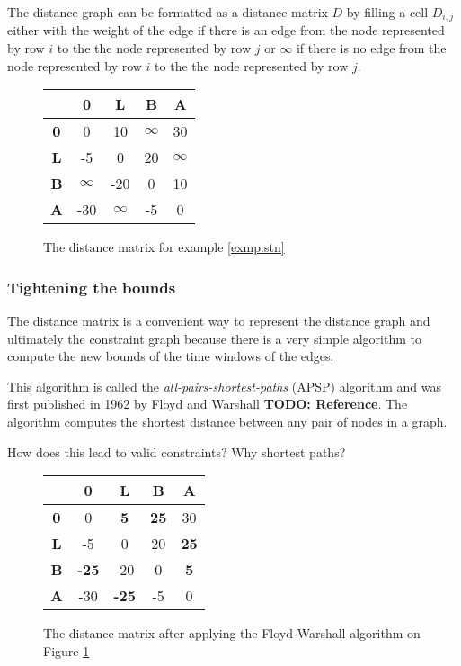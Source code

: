 \documentclass{article}
\theoremstyle{definition}
\newcommand{\TODO}[1]{{\color{red}\textbf{TODO: #1}}}
\begin{document}
The distance graph can be formatted as a distance matrix $D$ by filling a cell $D_{i,j}$ either with the weight of the edge if there is an edge from the node represented by row $i$ to the the node represented by row $j$ or $\infty$ if there is no edge from the node represented by row $i$ to the the node represented by row $j$.

\begin{figure}[h]
	\centering
	\begin{tabular}{ c | c c c c }
	  			& \textbf{0}	& \textbf{L} 	& \textbf{B} 	& \textbf{A} \\ \hline
	  \textbf{0} 	& 0 			& 10		& $\infty$ 	& 30 \\
	  \textbf{L} 	& -5 		& 0			& 20		& $\infty$ \\
	  \textbf{B} 	& $\infty$ 	& -20		& 0			& 10 \\
	  \textbf{A} 	& -30		& $\infty$	& -5 		& 0 \\
	\end{tabular}
	\caption{The distance matrix for example \ref{exmp:stn}}
	\label{fig:distance_matrix}
\end{figure}

\subsubsection{Tightening the bounds}
The distance matrix is a convenient way to represent the distance graph and ultimately the constraint graph because there is a very simple algorithm to compute the new bounds of the time windows of the edges. 

This algorithm is called the \emph{all-pairs-shortest-paths} (APSP) algorithm and was first published in 1962 by Floyd and Warshall \TODO{Reference}. The algorithm computes the shortest distance between any pair of nodes in a graph. 

How does this lead to valid constraints? Why shortest paths?

\begin{figure}[h]
	\centering
	\begin{tabular}{ c | c c c c }
	  			& \textbf{0}		& \textbf{L} 		& \textbf{B} 		& \textbf{A} \\ \hline
	  \textbf{0} 	& 0 				& \textbf{5}		& \textbf{25} 	& 30 \\
	  \textbf{L} 	& -5 			& 0				& 20			& \textbf{25} \\
	  \textbf{B} 	& \textbf{-25}	& -20			& 0				& \textbf{5} \\
	  \textbf{A} 	& -30			& \textbf{-25}	& -5 			& 0 \\
	\end{tabular}
	\caption{The distance matrix after applying the Floyd-Warshall algorithm on Figure \ref{fig:distance_matrix}}
\end{figure}
\end{document}
